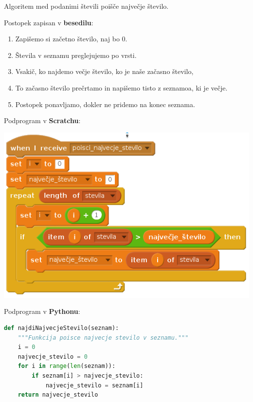 \begin{tcolorbox}[
colframe=sbase2!100,
colback=sbase3!100,
coltitle=sbase00!100!black,
colupper=sbase01!100!black,
fonttitle=\bfseries,
adjusted title=\textbf{Algoritem - Najdi največje število}]
Algoritem med podanimi števili poišče največje število.

Postopek zapisan v \textbf{besedilu}:
\begin{enumerate}
\tightlist
\item Zapišemo si začetno število, naj bo $0$.
\item Števila v seznamu preglejujemo po vrsti.
\item Vsakič, ko najdemo večje število, ko je naše začasno število,
\item To začasno število prečrtamo in napišemo tisto z seznamoa, ki je
  večje.
\item Postopek ponavljamo, dokler ne pridemo na konec seznama.
\end{enumerate}


Podprogram v \textbf{Scratchu}:

    \includegraphics [width=0.6\linewidth, keepaspectratio =
    1] {./images/scratchImg/01-Scr_Alg-NajvecjeSt-img_trs.png}

Podprogram v \textbf{Pythonu}:

\begin{lstlisting}[language=Python]
def najdiNajvecjeStevilo(seznam):
    """Funkcija poisce najvecje stevilo v seznamu."""
    i = 0
    najvecje_stevilo = 0
    for i in range(len(seznam)):
        if seznam[i] > najvecje_stevilo:
            najvecje_stevilo = seznam[i]
    return najvecje_stevilo
\end{lstlisting}
\end{tcolorbox}


